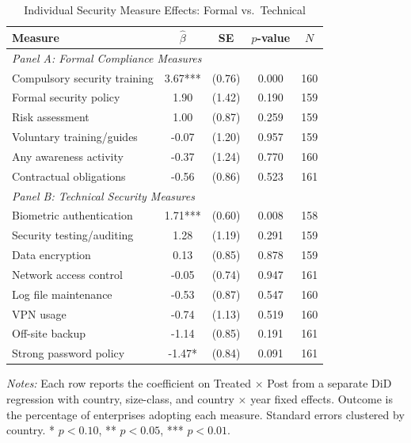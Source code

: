 \begin{table}[H]
\centering
\caption{Individual Security Measure Effects: Formal vs.\ Technical}
\label{tab:indicators}
\begin{threeparttable}
\begin{tabular}{lcccc}
\toprule
Measure & $\hat{\beta}$ & SE & $p$-value & $N$ \\
\midrule
\multicolumn{5}{l}{\textit{Panel A: Formal Compliance Measures}} \\
Compulsory security training & 3.67*** & (0.76) & 0.000 & 160 \\
Formal security policy & 1.90 & (1.42) & 0.190 & 159 \\
Risk assessment & 1.00 & (0.87) & 0.259 & 159 \\
Voluntary training/guides & -0.07 & (1.20) & 0.957 & 159 \\
Any awareness activity & -0.37 & (1.24) & 0.770 & 160 \\
Contractual obligations & -0.56 & (0.86) & 0.523 & 161 \\
\midrule
\multicolumn{5}{l}{\textit{Panel B: Technical Security Measures}} \\
Biometric authentication & 1.71*** & (0.60) & 0.008 & 158 \\
Security testing/auditing & 1.28 & (1.19) & 0.291 & 159 \\
Data encryption & 0.13 & (0.85) & 0.878 & 159 \\
Network access control & -0.05 & (0.74) & 0.947 & 161 \\
Log file maintenance & -0.53 & (0.87) & 0.547 & 160 \\
VPN usage & -0.74 & (1.13) & 0.519 & 160 \\
Off-site backup & -1.14 & (0.85) & 0.191 & 161 \\
Strong password policy & -1.47* & (0.84) & 0.091 & 161 \\
\bottomrule
\end{tabular}
\begin{tablenotes}[flushleft]
\small
\item \textit{Notes:} Each row reports the coefficient on Treated $\times$ Post from a separate DiD regression with country, size-class, and country $\times$ year fixed effects. Outcome is the percentage of enterprises adopting each measure. Standard errors clustered by country. * $p<0.10$, ** $p<0.05$, *** $p<0.01$.
\end{tablenotes}
\end{threeparttable}
\end{table}
